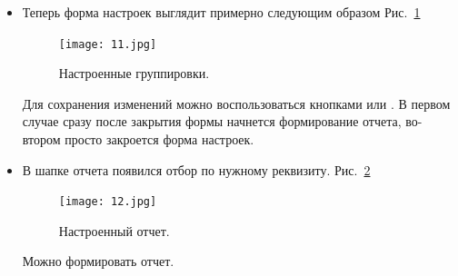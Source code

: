 \begin{itemize}
\item Теперь форма настроек выглядит примерно следующим образом Рис.~\ref{ris:11.jpg}
\begin{figure}[H]
	\texttt{[image: 11.jpg]}
	\caption{Настроенные группировки.}
	\label{ris:11.jpg}
\end{figure}
Для сохранения изменений можно воспользоваться кнопками  или  .
В первом случае сразу после закрытия формы начнется формирование отчета, во-втором просто закроется форма настроек.

\item В шапке отчета появился отбор по нужному реквизиту. Рис.~\ref{ris:12.jpg}
\begin{figure}[H]
	\texttt{[image: 12.jpg]}
	\caption{Настроенный отчет.}
	\label{ris:12.jpg}
\end{figure}

Можно формировать отчет.
	
\end{itemize}
